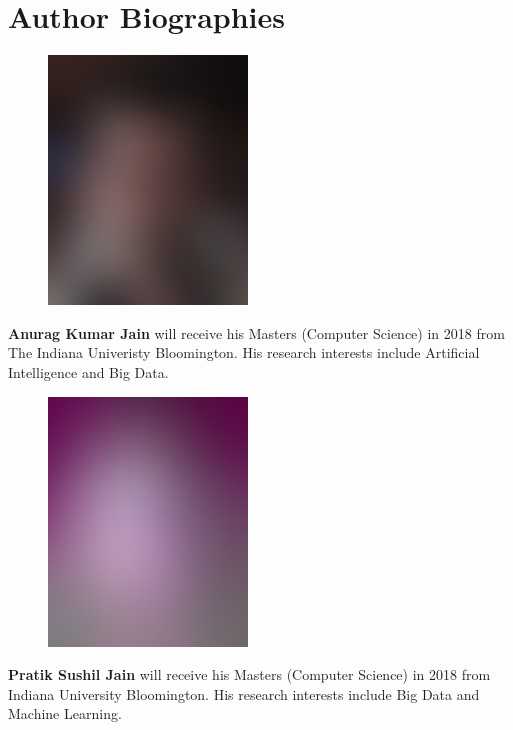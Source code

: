 \documentclass[9pt,twocolumn,twoside]{../../styles/osajnl}
\begin{document}
\section*{Author Biographies}
	\begingroup \setlength\intextsep{0pt}
	\begin{minipage}[t][3.2cm][t]{1.0\columnwidth}
	  \begin{figure}
	    \includegraphics[width=0.25\columnwidth]{images/john_smith.eps}
	  \end{figure}
	  \noindent
	  {\bfseries Anurag Kumar Jain} will receive his Masters (Computer Science)
	  in 2018 from The Indiana Univeristy Bloomington. His research
	  interests include Artificial Intelligence and Big Data.
	\end{minipage}
	\begin{minipage}[t][3.2cm][t]{1.0\columnwidth} %
	  \begin{figure}
	    \includegraphics[width=0.25\columnwidth]{images/alice_smith.eps}
	  \end{figure}
	  \noindent
	  {\bfseries Pratik Sushil Jain} will receive his Masters (Computer
	  Science) in 2018 from Indiana University Bloomington. His research
	  interests include Big Data and Machine Learning.
	\end{minipage}
\end{document}
